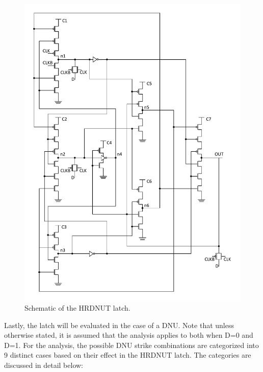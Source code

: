 \begin{figure}[!tbp]
	\centering
	\includegraphics[width=0.95\linewidth]{Figures/HRDNUT}
	\caption{Schematic of the HRDNUT latch.}
	\label{HRDNUT}
\end{figure} 

Lastly, the latch will be evaluated in the case of a DNU. Note that unless otherwise stated, it is assumed that the analysis applies to both when D=0 and D=1. For the analysis, the possible DNU strike combinations are categorized into 9 distinct cases based on their effect in the HRDNUT latch. The categories are discussed in detail below:

